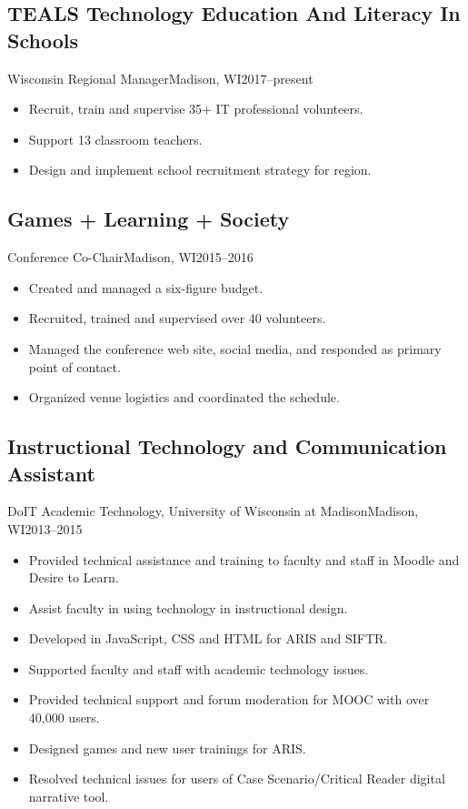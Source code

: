 \documentclass[../main.tex]{subfiles}
\begin{document}
\subsection{TEALS Technology Education And Literacy In Schools}{Wisconsin Regional Manager}{Madison, WI}{2017--present}
	\begin{itemize}
		\item{Recruit, train and supervise 35+ IT professional volunteers.}
		\item{Support 13 classroom teachers.}
		\item{Design and implement school recruitment strategy for region.}

	\end{itemize}


\subsection{Games + Learning + Society }{Conference Co-Chair}{Madison, WI}{2015--2016}
	\begin{itemize}
		\item{Created and managed a six-figure budget.}
		\item{Recruited, trained and supervised over 40 volunteers.}
		\item{Managed the conference web site, social media, and responded as primary point of contact.}
		\item{Organized venue logistics and coordinated the schedule.}

	\end{itemize}

	\subsection{Instructional Technology and Communication Assistant}{DoIT Academic Technology, University of Wisconsin at Madison}{Madison, WI}{2013--2015}
	\begin{itemize}
		\item{Provided technical assistance and training to faculty and staff in Moodle and Desire to Learn.}
		\item{Assist faculty in using technology in instructional design.}
		\item{Developed in JavaScript, CSS and HTML for ARIS and SIFTR.}
		\item{Supported faculty and staff with academic technology issues.}
		\item{Provided technical support and forum moderation for MOOC with over 40,000 users.}
		\item{Designed games and new user trainings for ARIS.}
		\item{Resolved technical issues for users of Case Scenario/Critical Reader digital narrative tool.}

	\end{itemize}
\end{document}
